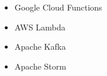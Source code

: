 \begin{itemize}
    \item Google Cloud Functions
    \item AWS Lambda
    \item Apache Kafka
    \item Apache Storm
\end{itemize}